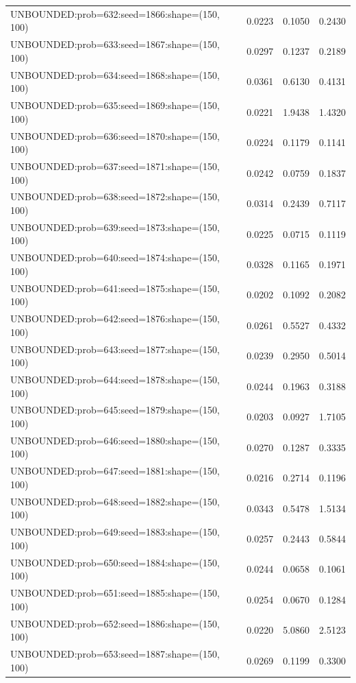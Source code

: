 \begin{longtable}{lccc}
UNBOUNDED:prob=632:seed=1866:shape=(150, 100) &   0.0223 &  0.1050 &  0.2430 \\
UNBOUNDED:prob=633:seed=1867:shape=(150, 100) &   0.0297 &  0.1237 &  0.2189 \\
UNBOUNDED:prob=634:seed=1868:shape=(150, 100) &   0.0361 &  0.6130 &  0.4131 \\
UNBOUNDED:prob=635:seed=1869:shape=(150, 100) &   0.0221 &  1.9438 &  1.4320 \\
UNBOUNDED:prob=636:seed=1870:shape=(150, 100) &   0.0224 &  0.1179 &  0.1141 \\
UNBOUNDED:prob=637:seed=1871:shape=(150, 100) &   0.0242 &  0.0759 &  0.1837 \\
UNBOUNDED:prob=638:seed=1872:shape=(150, 100) &   0.0314 &  0.2439 &  0.7117 \\
UNBOUNDED:prob=639:seed=1873:shape=(150, 100) &   0.0225 &  0.0715 &  0.1119 \\
UNBOUNDED:prob=640:seed=1874:shape=(150, 100) &   0.0328 &  0.1165 &  0.1971 \\
UNBOUNDED:prob=641:seed=1875:shape=(150, 100) &   0.0202 &  0.1092 &  0.2082 \\
UNBOUNDED:prob=642:seed=1876:shape=(150, 100) &   0.0261 &  0.5527 &  0.4332 \\
UNBOUNDED:prob=643:seed=1877:shape=(150, 100) &   0.0239 &  0.2950 &  0.5014 \\
UNBOUNDED:prob=644:seed=1878:shape=(150, 100) &   0.0244 &  0.1963 &  0.3188 \\
UNBOUNDED:prob=645:seed=1879:shape=(150, 100) &   0.0203 &  0.0927 &  1.7105 \\
UNBOUNDED:prob=646:seed=1880:shape=(150, 100) &   0.0270 &  0.1287 &  0.3335 \\
UNBOUNDED:prob=647:seed=1881:shape=(150, 100) &   0.0216 &  0.2714 &  0.1196 \\
UNBOUNDED:prob=648:seed=1882:shape=(150, 100) &   0.0343 &  0.5478 &  1.5134 \\
UNBOUNDED:prob=649:seed=1883:shape=(150, 100) &   0.0257 &  0.2443 &  0.5844 \\
UNBOUNDED:prob=650:seed=1884:shape=(150, 100) &   0.0244 &  0.0658 &  0.1061 \\
UNBOUNDED:prob=651:seed=1885:shape=(150, 100) &   0.0254 &  0.0670 &  0.1284 \\
UNBOUNDED:prob=652:seed=1886:shape=(150, 100) &   0.0220 &  5.0860 &  2.5123 \\
UNBOUNDED:prob=653:seed=1887:shape=(150, 100) &   0.0269 &  0.1199 &  0.3300 \\

\end{longtable}
